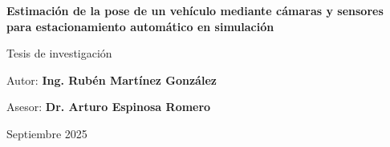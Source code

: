 \documentclass[10pt,letterpaper,final]{report}
\newcommand{\advisor}{Dr. Arturo Espinosa Romero}
\newcommand{\myauthor}{Ing. Rubén Martínez González}
\newcommand{\tesisInv}{Tesis de investigación}
\newcommand{\mydate}{Septiembre 2025}
\newcommand{\mytitle}{Estimación de la pose de un vehículo mediante cámaras y sensores para estacionamiento automático en simulación}
\begin{document}
\begin{titlepage}
    \vspace{1.5cm}
    {\LARGE\bfseries \mytitle \par}
    \vspace{1.5cm}
    {\Large \tesisInv \par}
    \vspace{1cm}
    {\large Autor: \textbf{\myauthor}\par}
    \vspace{0.5cm}
    {\large Asesor: \textbf{\advisor}\par}
    \vfill
    \vspace{0.5cm}
    {\large \mydate \par}
\end{titlepage}

\begin{abstract}
    
\end{abstract}
\clearpage


\tableofcontents
\listoffigures
\clearpage
\end{document}
